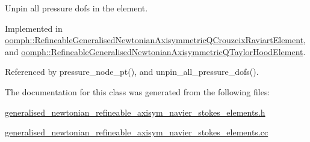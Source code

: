 Unpin all pressure dofs in the element. 



Implemented in \hyperlink{classoomph_1_1RefineableGeneralisedNewtonianAxisymmetricQCrouzeixRaviartElement_af2bed6ea40d0520dc570b62b3fd81b7d}{oomph\+::\+Refineable\+Generalised\+Newtonian\+Axisymmetric\+Q\+Crouzeix\+Raviart\+Element}, and \hyperlink{classoomph_1_1RefineableGeneralisedNewtonianAxisymmetricQTaylorHoodElement_ad454d2660371f7a2b3bcbd7a951762b5}{oomph\+::\+Refineable\+Generalised\+Newtonian\+Axisymmetric\+Q\+Taylor\+Hood\+Element}.



Referenced by pressure\+\_\+node\+\_\+pt(), and unpin\+\_\+all\+\_\+pressure\+\_\+dofs().



The documentation for this class was generated from the following files\+:\begin{DoxyCompactItemize}
\item 
\hyperlink{generalised__newtonian__refineable__axisym__navier__stokes__elements_8h}{generalised\+\_\+newtonian\+\_\+refineable\+\_\+axisym\+\_\+navier\+\_\+stokes\+\_\+elements.\+h}\item 
\hyperlink{generalised__newtonian__refineable__axisym__navier__stokes__elements_8cc}{generalised\+\_\+newtonian\+\_\+refineable\+\_\+axisym\+\_\+navier\+\_\+stokes\+\_\+elements.\+cc}\end{DoxyCompactItemize}
